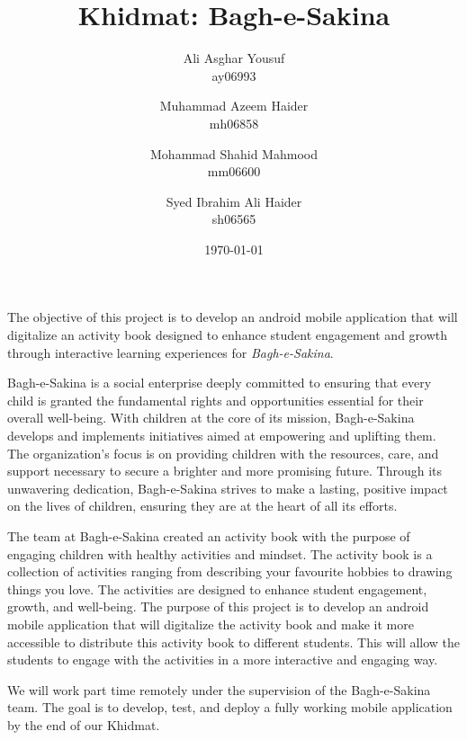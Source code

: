 \documentclass{article}
\title {Khidmat: Bagh-e-Sakina}
\author{
  Ali Asghar Yousuf\\ ay06993
  \and
  Muhammad Azeem Haider\\ mh06858
  \and
  Mohammad Shahid Mahmood\\ mm06600
  \and
  Syed Ibrahim Ali Haider\\ sh06565
}
\date{\today}
\begin{document}
\maketitle



The objective of this project is to develop an android mobile application that will digitalize an activity book designed to enhance student engagement and growth through interactive learning experiences for \textit{Bagh-e-Sakina}.

\vspace{1em}

Bagh-e-Sakina is a social enterprise deeply committed to ensuring that every child is granted the fundamental rights and opportunities essential for their overall well-being. With children at the core of its mission, Bagh-e-Sakina develops and implements initiatives aimed at empowering and uplifting them. The organization’s focus is on providing children with the resources, care, and support necessary to secure a brighter and more promising future. Through its unwavering dedication, Bagh-e-Sakina strives to make a lasting, positive impact on the lives of children, ensuring they are at the heart of all its efforts.

\vspace{1em}

The team at Bagh-e-Sakina created an activity book with the purpose of engaging children with healthy activities and mindset. The activity book is a collection of activities ranging from describing your favourite hobbies to drawing things you love. The activities are designed to enhance student engagement, growth, and well-being. The purpose of this project is to develop an android mobile application that will digitalize the activity book and make it more accessible to distribute this activity book to different students. This will allow the students to engage with the activities in a more interactive and engaging way.

\vspace{1em}

We will work part time remotely under the supervision of the Bagh-e-Sakina team. The goal is to develop, test, and deploy a fully working mobile application by the end of our Khidmat.
\end{document}

